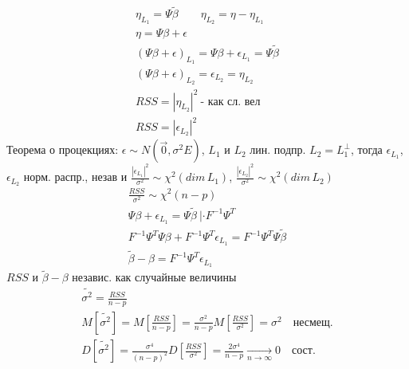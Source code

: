 \documentclass{article}
\begin{document}
  \begin{gather*}
    \eta_{L_1} = \Psi \tilde{\beta} \qquad \eta_{L_2} = \eta-\eta_{L_1} \\ 
    \eta = \Psi \beta + \epsilon \\ 
    (\Psi \beta + \epsilon)_{L_1} = \Psi \beta + \epsilon_{L_1} = \Psi \tilde{\beta} \\ 
    (\Psi \beta + \epsilon)_{L_2} = \epsilon_{L_2}=\eta_{L_2} \\ 
    RSS = |\eta_{L_2}|^{2} \ \text{- как сл. вел} \\ 
    RSS=|\epsilon_{L_2}|^{2}
  \end{gather*}
  Теорема о процекциях: $\epsilon \sim N(\vec{0}, \sigma^{2} E)$, $L_1$ и $L_2$ лин. подпр.
  $L_2 = L_1^{\perp}$, тогда $\epsilon_{L_1}$, $\epsilon_{L_2}$ норм. распр., незав
  и $\frac{|\epsilon_{L_1}|^{2}}{\sigma^{2}} \sim \chi^{2}(dim \, L_1)$,
  $\frac{|\epsilon_{L_2}|^{2}}{\sigma^{2}} \sim \chi^{2}(dim \, L_2)$
  \begin{gather*}
    \frac{RSS}{\sigma^{2}} \sim \chi^{2}(n-p) \\ 
    \Psi \beta + \epsilon_{L_1}=\Psi \tilde{\beta} \ |\cdot F^{-1}\Psi^{T} \\ 
  F^{-1}\Psi^{T}\Psi \beta + F^{-1}\Psi^{T}\epsilon_{L_1}=F^{-1}\Psi^{T}\Psi \tilde{\beta} \\ 
  \tilde{\beta} - \beta = F^{-1}\Psi^{T}\epsilon_{L_1}
  \end{gather*}
  $RSS$ и $\tilde{\beta}-\beta$ независ. как случайные величины
  \begin{gather*}
    \tilde{\sigma^{2}}=\frac{RSS}{n-p} \\ 
    M[\tilde{\sigma^{2}}]=M[\frac{RSS}{n-p}]=\frac{\sigma^{2}}{n-p}M[\frac{RSS}{\sigma^{2}}]=\sigma^{2} \quad \text{несмещ.} \\ 
  D[\tilde{\sigma^{2}}]=\frac{\sigma^{4}}{(n-p)^{2}}D[\frac{RSS}{\sigma^{2}}]=\frac{2\sigma^{4}}{n-p} \underset{n\to\infty}{\to} 0 \quad \text{сост.}
  \end{gather*}
\end{document}
